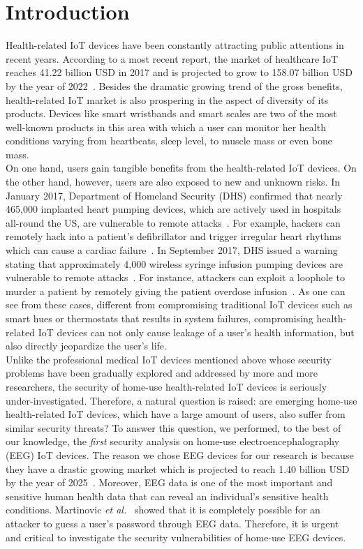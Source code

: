 \section{Introduction}
\label{sec:introduction}
Health-related IoT devices have been constantly attracting public attentions in recent years. According to a most recent report, the market of healthcare IoT reaches 41.22 billion USD in 2017 and is projected to grow to 158.07 billion USD by the year of 2022~\cite{healthiotmarket}. Besides the dramatic growing trend of the gross benefits, health-related IoT market is also prospering in the aspect of diversity of its products. Devices like smart wristbands and smart scales are two of the most well-known products in this area with which a user can monitor her health conditions varying from heartbeats, sleep level, to muscle mass or even bone mass.\\
\indent On one hand, users gain tangible benefits from the health-related IoT devices. On the other hand, however, users are also exposed to new and unknown risks. In January 2017, Department of Homeland Security (DHS) confirmed that nearly 465,000 implanted heart pumping devices, which are actively used in hospitals all-round the US, are vulnerable to remote attacks~\cite{heartpump}. For example, hackers can remotely hack into a patient's defibrillator and trigger irregular heart rhythms which can cause a cardiac failure~\cite{heartpump}. In September 2017, DHS issued a warning stating that approximately 4,000 wireless syringe infusion pumping devices are vulnerable to remote attacks~\cite{infusionhack}. For instance, attackers can exploit a loophole to murder a patient by remotely giving the patient overdose infusion~\cite{infusionhack}. As one can see from these cases, different from compromising traditional IoT devices such as smart hues or thermostats that results in system failures, compromising health-related IoT devices can not only cause leakage of a user's health information, but also directly jeopardize the user's life.\\
\indent Unlike the professional medical IoT devices mentioned above whose security problems have been gradually explored and addressed by more and more researchers, the security of home-use health-related IoT devices is seriously under-investigated. Therefore, a natural question is raised: are emerging home-use health-related IoT devices, which have a large amount of users, also suffer from similar security threats? To answer this question, we performed, to the best of our knowledge, the \emph{first} security analysis on home-use electroencephalography (EEG) IoT devices. The reason we chose EEG devices for our research is because they have a drastic growing market which is projected to reach 1.40 billion USD by the year of 2025~\cite{2025eegdevicemarket}. Moreover, EEG data is one of the most important and sensitive human health data that can reveal an individual's sensitive health conditions. Martinovic \emph{et al.}~\cite{martinovic2012feasibility} showed that it is completely possible for an attacker to guess a user's password through EEG data. Therefore, it is urgent and critical to investigate the security vulnerabilities of home-use EEG devices.\\

